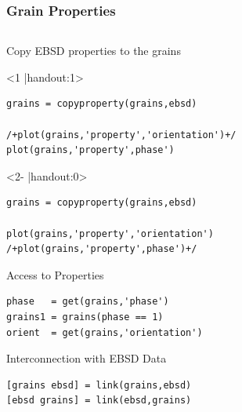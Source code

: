 \begin{frame}[fragile]
  \frametitle{Grain Properties}

  \begin{columns}
    \begin{column}{8.5cm}


      Copy EBSD properties to the grains

\begin{onlyenv}<1 |handout:1>
\begin{lstlisting}
grains = copyproperty(grains,ebsd)

/+plot(grains,'property','orientation')+/
plot(grains,'property',phase')
\end{lstlisting}
\end{onlyenv}

\begin{onlyenv}<2- |handout:0>
\begin{lstlisting}
grains = copyproperty(grains,ebsd)

plot(grains,'property','orientation')
/+plot(grains,'property',phase')+/
\end{lstlisting}
\end{onlyenv}

\pause
\pause

Access to Properties
\begin{lstlisting}
phase   = get(grains,'phase')
grains1 = grains(phase == 1)
orient  = get(grains,'orientation')
\end{lstlisting}

Interconnection with EBSD Data
\begin{lstlisting}
[grains ebsd] = link(grains,ebsd)
[ebsd grains] = link(ebsd,grains)
\end{lstlisting}


\end{column}
\end{columns}
\end{frame}

